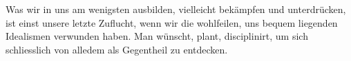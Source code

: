 Was wir in uns am wenigsten ausbilden, vielleicht bekämpfen und unterdrücken, ist einst unsere letzte Zuflucht, wenn wir die wohlfeilen, uns bequem liegenden Idealismen verwunden haben. Man wünscht, plant, disciplinirt, um sich schliesslich von alledem als Gegentheil zu entdecken.
\par

